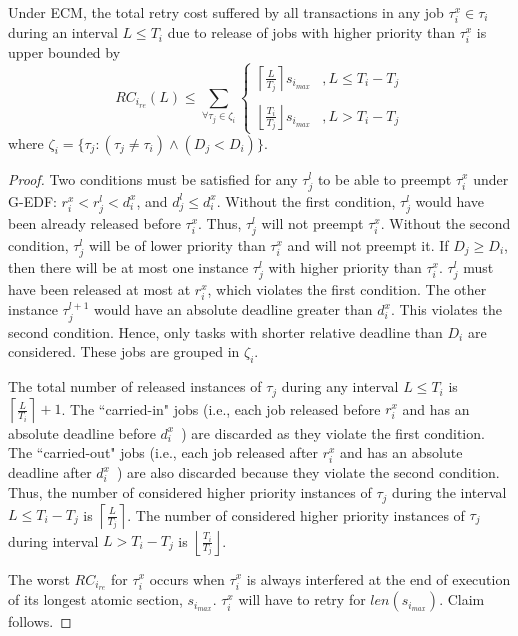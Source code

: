%
\begin{clm}\label{clm:ecm_release_conflict}
%
Under ECM, the total retry cost suffered by all transactions in any job $\tau_i^x \in \tau_i$ during an interval $L \le T_i$ due to release of jobs with higher priority than $\tau_i^x$ is upper bounded by 
\begin{equation}
RC_{i_{re}}(L) \le \sum_{\forall \tau_{j}\in\zeta_{i}}\begin{cases}
\left\lceil \frac{L}{T_{j}}\right\rceil s_{i_{max}} & ,L\le T_{i}-T_{j}\\\\
\left\lfloor \frac{T_{i}}{T_{j}}\right\rfloor s_{i_{max}} & ,L>T_{i}-T_{j}
\end{cases}\label{eq:ecm_release_conflict}
\end{equation}
%
where $\zeta_i=\{\tau_j:\left(\tau_j \ne \tau_i\right)\wedge \left(D_j < D_i \right)\}$.
\end{clm}
%
\begin{proof}
Two conditions must be satisfied for any $\tau_{j}^{l}$ to be able to preempt
$\tau_{i}^{x}$ under G-EDF: $r_{i}^{x}<r_{j}^{l}<d_{i}^{x}$,
and $d_{j}^{l}\le d_{i}^{x}$. Without the first condition, $\tau_{j}^{l}$
would have been already released before $\tau_{i}^{x}$. Thus, $\tau_j^l$ will
not preempt $\tau_i^x$. Without the second condition, $\tau_{j}^{l}$ will
be of lower priority than $\tau_{i}^{x}$ and will not preempt it.
If $D_{j} \ge D_{i}$, then there will be at most one instance $\tau_j^l$ with higher priority than $\tau_{i}^{x}$. $\tau_j^l$ must have been released at most at $r_i^x$, which violates the first condition. The other instance $\tau_j^{l+1}$ would have an absolute deadline greater than $d_i^x$. This violates the second condition. Hence, only tasks with shorter relative deadline than $D_{i}$ are considered. These jobs are grouped in $\zeta_i$.

The total number of released instances of $\tau_{j}$ during any interval $L\le T_{i}$ is $\left\lceil \frac{L}{T_{i}}\right\rceil +1$. The ``carried-in" jobs (i.e., each job released before $r_i^x$ and has an absolute deadline before $d_i^x$~\cite{key-2}) are discarded as they violate the first condition. The ``carried-out" jobs (i.e., each job released after $r_i^x$ and has an absolute deadline after $d_i^x$~\cite{key-2}) are also discarded because they violate the second condition. Thus, the number of considered higher priority instances of $\tau_j$ during the interval $L\le T_i-T_j$ is $\left\lceil\frac{L}{T_j}\right\rceil$. The number of considered higher priority instances of $\tau_j$ during interval $L> T_i-T_j$ is $\left\lfloor\frac{T_i}{T_j}\right\rfloor$.

The worst $RC_{i_{re}}$ for $\tau_i^x$ occurs when $\tau_i^x$ is always interfered at the end of execution of its longest atomic section, $s_{i_{max}}$. $\tau_i^x$ will have to retry for $len(s_{i_{max}})$. Claim follows.
\end{proof}
